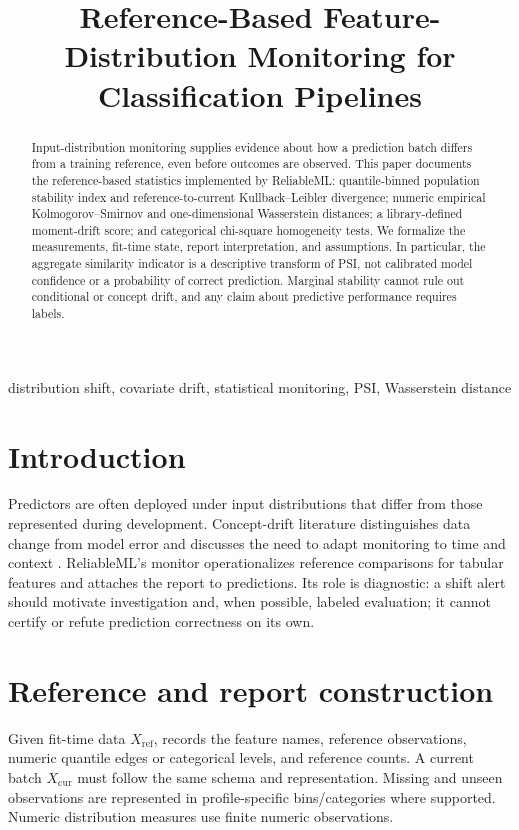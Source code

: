 \documentclass[conference]{IEEEtran}
\title{Reference-Based Feature-Distribution Monitoring for Classification Pipelines}
\author{
\jabulaniauthor
\and
\martinchanzauthor
}
\begin{document}
\maketitle

\begin{abstract}
Input-distribution monitoring supplies evidence about how a prediction batch differs from a training reference, even before outcomes are observed. This paper documents the reference-based statistics implemented by ReliableML: quantile-binned population stability index and reference-to-current Kullback--Leibler divergence; numeric empirical Kolmogorov--Smirnov and one-dimensional Wasserstein distances; a library-defined moment-drift score; and categorical chi-square homogeneity tests. We formalize the measurements, fit-time state, report interpretation, and assumptions. In particular, the aggregate similarity indicator is a descriptive transform of PSI, not calibrated model confidence or a probability of correct prediction. Marginal stability cannot rule out conditional or concept drift, and any claim about predictive performance requires labels.
\end{abstract}

\begin{IEEEkeywords}
distribution shift, covariate drift, statistical monitoring, PSI, Wasserstein distance
\end{IEEEkeywords}

\section{Introduction}
Predictors are often deployed under input distributions that differ from those represented during development. Concept-drift literature distinguishes data change from model error and discusses the need to adapt monitoring to time and context \cite{gama2014}. ReliableML's monitor operationalizes reference comparisons for tabular features and attaches the report to predictions. Its role is diagnostic: a shift alert should motivate investigation and, when possible, labeled evaluation; it cannot certify or refute prediction correctness on its own.

\section{Reference and report construction}
Given fit-time data \(X_{\mathrm{ref}}\),  records the feature names, reference observations, numeric quantile edges or categorical levels, and reference counts. A current batch \(X_{\mathrm{cur}}\) must follow the same schema and representation. Missing and unseen observations are represented in profile-specific bins/categories where supported. Numeric distribution measures use finite numeric observations.
\end{document}

